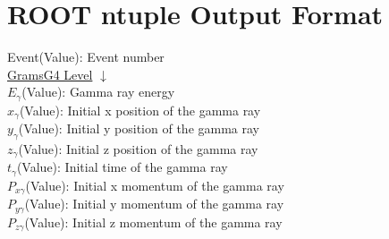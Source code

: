 \documentclass{article}
\begin{document}
\section*{\centering ROOT ntuple Output Format}
Event(Value): Event number\\
\underline{GramsG4 Level} $\downarrow$ \\
$E_\gamma$(Value): Gamma ray energy\\
$x_\gamma$(Value): Initial x position of the gamma ray\\
$y_\gamma$(Value): Initial y position of the gamma ray\\
$z_\gamma$(Value): Initial z position of the gamma ray\\
$t_\gamma$(Value): Initial time of the gamma ray\\
$P_{x\gamma}$(Value): Initial x momentum of the gamma ray\\
$P_{y\gamma}$(Value): Initial y momentum of the gamma ray\\
$P_{z\gamma}$(Value): Initial z momentum of the gamma ray\\
\end{document}
